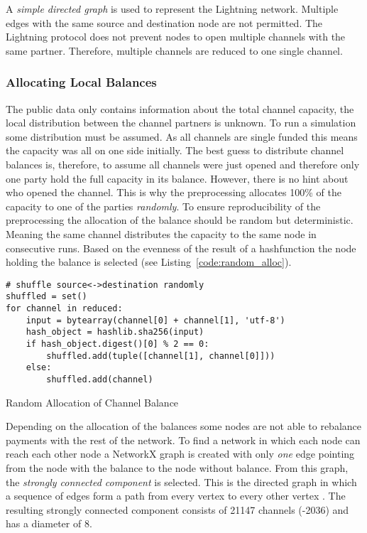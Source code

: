 \documentclass[final]{fhnwreport}       %
\begin{document}
A \emph{simple directed graph} is used to represent the Lightning network. Multiple edges with the same source and destination node are not permitted. The Lightning protocol does not prevent nodes to open multiple channels with the same partner. Therefore, multiple channels are reduced to one single channel.

\subsubsection{Allocating Local Balances}
The public data only contains information about the total channel capacity, the local distribution between the channel partners is unknown. To run a simulation some distribution must be assumed. As all channels are single funded this means the capacity was all on one side initially. The best guess to distribute channel balances is, therefore, to assume all channels were just opened and therefore only one party hold the full capacity in its balance. However, there is no hint about who opened the channel. This is why the preprocessing allocates 100\% of the capacity to one of the parties \emph{randomly}. To ensure reproducibility of the preprocessing the allocation of the balance should be random but deterministic. Meaning the same channel distributes the capacity to the same node in consecutive runs. Based on the evenness of the result of a \gls{hashfunction} the node holding the balance is selected (see Listing~\ref{code:random_alloc}).

\begin{listing}[H]
  \begin{verbatim}
# shuffle source<->destination randomly
shuffled = set()
for channel in reduced:
    input = bytearray(channel[0] + channel[1], 'utf-8')
    hash_object = hashlib.sha256(input)
    if hash_object.digest()[0] % 2 == 0:
        shuffled.add(tuple([channel[1], channel[0]]))
    else:
        shuffled.add(channel) 
  \end{verbatim}
  \caption{Random Allocation of Channel Balance}
  \label{code:random_alloc}
\end{listing}

Depending on the allocation of the balances some nodes are not able to rebalance payments with the rest of the network. To find a network in which each node can reach each other node a NetworkX graph is created with only \emph{one} edge pointing from the node with the balance to the node without balance. From this graph, the \emph{strongly connected component} is selected. This is the directed graph in which a sequence of edges form a path from every vertex to every other vertex \citep{even_network_1975}. The resulting strongly connected component consists of 21147 channels (-2036) and has a diameter of 8.
\end{document}
